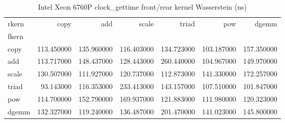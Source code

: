 \begin{table}
\caption{Intel Xeon 6760P clock_gettime front/rear kernel Wasserstein (ns)}
\begin{tabular}{lrrrrrr}
\toprule
rkern & copy & add & scale & triad & pow & dgemm \\
fkern &  &  &  &  &  &  \\
\midrule
copy & 113.450000 & 135.960000 & 116.403000 & 134.723000 & 103.187000 & 157.350000 \\
add & 113.717000 & 148.437000 & 128.443000 & 260.440000 & 104.967000 & 149.970000 \\
scale & 130.507000 & 111.927000 & 120.737000 & 112.873000 & 141.330000 & 172.257000 \\
triad & 93.143000 & 116.353000 & 233.413000 & 143.157000 & 107.510000 & 101.847000 \\
pow & 114.700000 & 152.790000 & 169.937000 & 121.883000 & 111.980000 & 120.323000 \\
dgemm & 132.327000 & 119.240000 & 136.487000 & 201.470000 & 141.023000 & 145.800000 \\
\bottomrule
\end{tabular}
\end{table}
